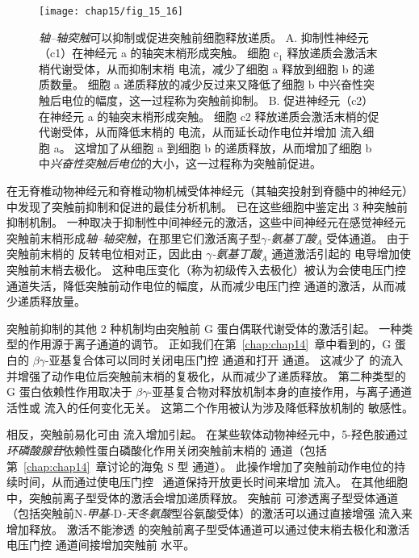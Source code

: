 \begin{figure}[htbp]
	\centering
	\texttt{[image: chap15/fig\_15\_16]}
	\caption{\textit{轴–轴突触}可以抑制或促进突触前细胞释放递质。
		A. 抑制性神经元（c1）在神经元 a 的轴突末梢形成突触。
		细胞 c$_1$ 释放递质会激活末梢代谢受体，从而抑制末梢  电流，减少了细胞 a 释放到细胞 b 的递质数量。
		细胞 a 递质释放的减少反过来又降低了细胞 b 中兴奋性突触后电位的幅度，这一过程称为突触前抑制。
		B. 促进神经元（c2）在神经元 a 的轴突末梢形成突触。
		细胞 c2 释放递质会激活末梢的促代谢受体，从而降低末梢的  电流，从而延长动作电位并增加  流入细胞 a。
		这增加了从细胞 a 到细胞 b 的递质释放，从而增加了细胞 b 中\textit{兴奋性突触后电位}的大小，这一过程称为突触前促进。}
	\label{fig:15_16}
\end{figure}



在无脊椎动物神经元和脊椎动物机械受体神经元（其轴突投射到脊髓中的神经元）中发现了突触前抑制和促进的最佳分析机制。
已在这些细胞中鉴定出 3 种突触前抑制机制。
一种取决于抑制性中间神经元的激活，这些中间神经元在感觉神经元突触前末梢形成\textit{轴–轴突触}，在那里它们激活离子型\textit{$\gamma$-氨基丁酸}$_A$ 受体通道。
由于突触前末梢的  反转电位相对正，因此由 \textit{$\gamma$-氨基丁酸}$_A$ 通道激活引起的  电导增加使突触前末梢去极化。
这种电压变化（称为初级传入去极化）被认为会使电压门控  通道失活，降低突触前动作电位的幅度，从而减少电压门控  通道的激活，从而减少递质释放量。


突触前抑制的其他 2 种机制均由突触前 G 蛋白偶联代谢受体的激活引起。
一种类型的作用源于离子通道的调节。
正如我们在第~\ref{chap:chap14}~章中看到的，G 蛋白的 $\beta\gamma$-亚基复合体可以同时关闭电压门控  通道和打开  通道。
这减少了  的流入并增强了动作电位后突触前末梢的复极化，从而减少了递质释放。
第二种类型的 G 蛋白依赖性作用取决于 $\beta\gamma$-亚基复合物对释放机制本身的直接作用，与离子通道活性或  流入的任何变化无关。
这第二个作用被认为涉及降低释放机制的  敏感性。


相反，突触前易化可由  流入增加引起。
在某些软体动物神经元中，5-羟色胺通过\textit{环磷酸腺苷}依赖性蛋白磷酸化作用关闭突触前末梢的  通道（包括第~\ref{chap:chap14}~章讨论的海兔 S 型  通道）。
此操作增加了突触前动作电位的持续时间，从而通过使电压门控~ 通道保持开放更长时间来增加  流入。
在其他细胞中，突触前离子型受体的激活会增加递质释放。
突触前  可渗透离子型受体通道（包括突触前N\textit{-甲基-}D\textit{-天冬氨酸}型谷氨酸受体）的激活可以通过直接增强  流入来增加释放。
激活不能渗透  的突触前离子型受体通道可以通过使末梢去极化和激活电压门控  通道间接增加突触前  水平。


